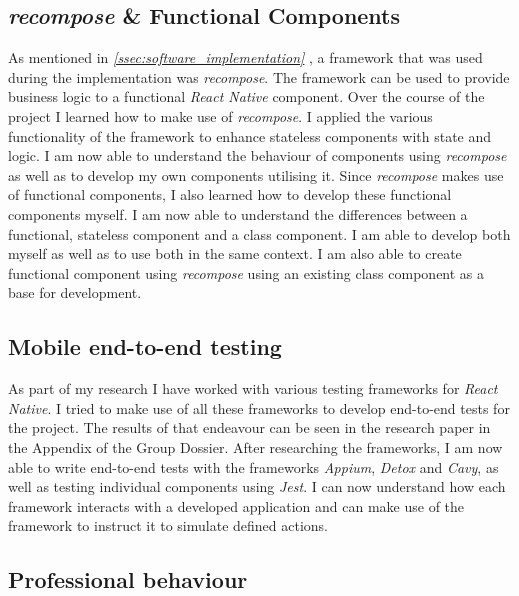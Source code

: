 \subsection{\textit{recompose} \& Functional Components}
\label{ssec:recompose}

As mentioned in \textit{\ref{ssec:software_implementation} }, a framework that was used during the implementation was \textit{recompose}. The framework can be used to provide business logic to a functional \textit{React Native} component.
\newline
Over the course of the project I learned how to make use of \textit{recompose}. I applied the various functionality of the framework to enhance stateless components with state and logic. I am now able to understand the behaviour of components using \textit{recompose} as well as to develop my own components utilising it.
\newline
Since \textit{recompose} makes use of functional components, I also learned how to develop these functional components myself. I am now able to understand the differences between a functional, stateless component and a class component. I am able to develop both myself as well as to use both in the same context. I am also able to create functional component using \textit{recompose} using an existing class component as a base for development.

\subsection{Mobile end-to-end testing}
\label{ssec:mobile_e2e_testing}

As part of my research I have worked with various testing frameworks for \textit{React Native}. I tried to make use of all these frameworks to develop end-to-end tests for the project. The results of that endeavour can be seen in the research paper in the Appendix of the Group Dossier.
\newline
After researching the frameworks, I am now able to write end-to-end tests with the frameworks \textit{Appium}, \textit{Detox} and \textit{Cavy}, as well as testing individual components using \textit{Jest}. I can now understand how each framework interacts with a developed application and can make use of the framework to instruct it to simulate defined actions.

\subsection{Professional behaviour}
\label{ssec:professional_behaviour}

